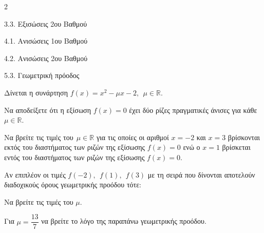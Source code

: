 \begin{ylh}{2}
    \item 3.3. Εξισώσεις 2ου Βαθμού
    \item 4.1. Ανισώσεις 1ου Βαθμού
    \item 4.2. Ανισώσεις 2ου Βαθμού
    \item 5.3. Γεωμετρική πρόοδος
\end{ylh}
Δίνεται η συνάρτηση $f(x) = x^{2} - \mu x - 2,\ \ \mu\mathbb{\in R}$.
\begin{alist}
\item Να αποδείξετε ότι η εξίσωση $f(x) = 0$ έχει δύο ρίζες πραγματικές άνισες για κάθε $\mu\mathbb{\in R}$.
\item Να βρείτε τις τιμές του$\ \ \mu\mathbb{\in R}$ για τις οποίες οι αριθμοί $x = - 2$ και $x = 3$ βρίσκονται εκτός του διαστήματος των ριζών της εξίσωσης $f(x) = 0$ ενώ ο $x = 1$ βρίσκεται εντός του διαστήματος των ριζών της εξίσωσης $f(x) = 0$.
\item Αν επιπλέον οι τιμές $f( - 2),\ \ f(1),\ \ f(3)$ με τη σειρά που δίνονται αποτελούν διαδοχικούς όρους γεωμετρικής προόδου τότε:
\begin{rlist}
\item
  Να βρείτε τις τιμές του $\mu$.
\item
  Για $\mu = \dfrac{13}{7}$ να βρείτε το λόγο της παραπάνω γεωμετρικής προόδου.
\end{rlist}
\end{alist}

